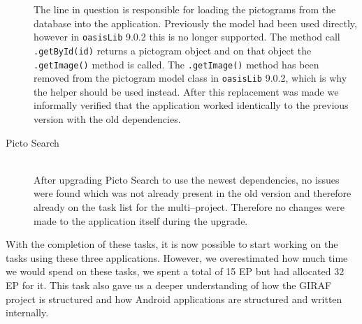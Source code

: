 \begin{description}
    The line in question is responsible for loading the pictograms from the database into the application.
    Previously the model had been used directly, however in \texttt{oasisLib} 9.0.2 this is no longer supported.
    The method call \texttt{.getById(id)} returns a pictogram object and on that object the \texttt{.getImage()} method is called.
    The \texttt{.getImage()} method has been removed from the pictogram model class in \texttt{oasisLib} 9.0.2, which is why the helper should be used instead.
    After this replacement was made we informally verified that the application worked identically to the previous version with the old dependencies.

    \item[Picto Search] \hfill \\
    After upgrading Picto Search to use the newest dependencies, no issues were found which was not already present in the old version and therefore already on the task list for the multi--project.
    Therefore no changes were made to the application itself during the upgrade.
\end{description}

 With the completion of these tasks, it is now possible to start working on the tasks using these three applications.
 However, we overestimated how much time we would spend on these tasks, we spent a total of 15 EP but had allocated 32 EP for it.
 This task also gave us a deeper understanding of how the GIRAF project is structured and how Android applications are structured and written internally.
